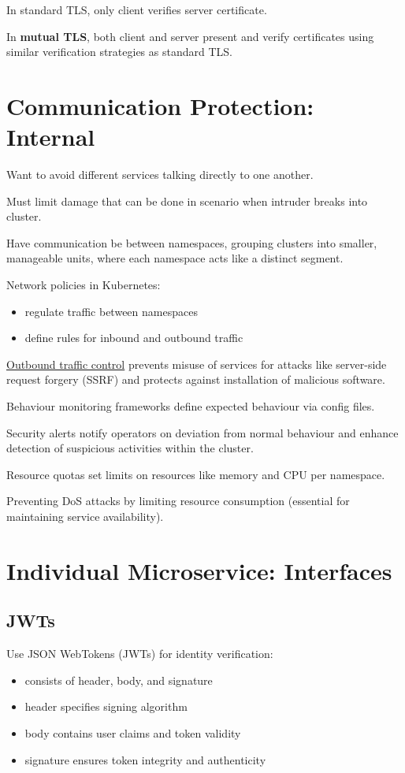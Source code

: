 \documentclass[11pt]{article}
\begin{document}
In standard TLS, only client verifies server certificate.

In \textbf{mutual TLS}, both client and server present and verify certificates using
similar verification strategies as standard TLS.
\section{Communication Protection: Internal}
\label{sec:orgb10a9f5}
Want to avoid different services talking directly to one another.

Must limit damage that can be done in scenario when intruder breaks into cluster.

Have communication be between namespaces, grouping clusters into smaller,
manageable units, where each namespace acts like a distinct segment.

Network policies in Kubernetes:
\begin{itemize}
\item regulate traffic between namespaces
\item define rules for inbound and outbound traffic
\end{itemize}

\uline{Outbound traffic control} prevents misuse of services for attacks like
server-side request forgery (SSRF) and protects against installation of
malicious software.

Behaviour monitoring frameworks define expected behaviour via config files.

Security alerts notify operators on deviation from normal behaviour and
enhance detection of suspicious activities within the cluster.

Resource quotas set limits on resources like memory and CPU per namespace.

Preventing DoS attacks by limiting resource consumption (essential for
maintaining service availability).
\section{Individual Microservice: Interfaces}
\label{sec:org34d48be}
\subsection{JWTs}
\label{sec:org161c553}
Use JSON WebTokens (JWTs) for identity verification:
\begin{itemize}
\item consists of header, body, and signature
\item header specifies signing algorithm
\item body contains user claims and token validity
\item signature ensures token integrity and authenticity
\end{itemize}
\end{document}
